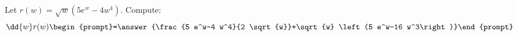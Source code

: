 \documentclass{ximera}
\author{Bart Snapp}
\begin{document}
\begin{exercise}
Let $r(w) = \sqrt{w} \left(5 e^w-4 w^4\right)$. Compute:
\[
\dd{w}r(w)
\begin{prompt}=\answer{\frac{5 e^w-4 w^4}{2 \sqrt{w}}+\sqrt{w} \left(5 e^w-16 w^3\right)}\end{prompt}
\]
\end{exercise}
\end{document}
